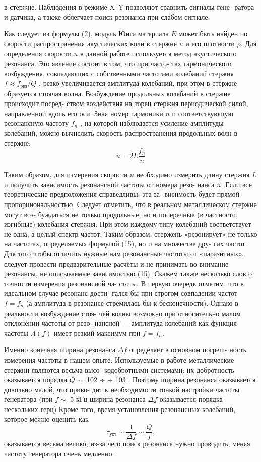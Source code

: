 \documentclass[a4, 12pt]{article}
\begin{document}
в стержне. Наблюдения в режиме X–Y позволяют сравнить сигналы гене-
ратора и датчика, а также облегчает поиск резонанса при слабом сигнале.
\par Как следует из формулы (2), модуль Юнга материала $E$ может быть
найден по скорости распространения акустических волн в стержне $u$ и его
плотности $\rho$. Для определения скорости $u$ в данной работе используется
метод акустического резонанса. Это явление состоит в том, что при часто-
тах гармонического возбуждения, совпадающих с собственными частотами
колебаний стержня $f \approx f_\text{рез}/Q$ , резко увеличивается амплитуда колебаний, при
этом в стержне образуется стоячая волна.
Возбуждение продольных колебаний в стержне происходит посред-
ством воздействия на торец стержня периодической силой, направленной
вдоль его оси. Зная номер гармоники $n$ и соответствующую резонансную
частоту $f_n$ , на которой наблюдается усиление амплитуды колебаний,
можно вычислить скорость распространения продольных волн в стержне:
\begin{equation}
    u = 2L\frac{f_n}{n}
\end{equation}

Таким образом, для измерения скорости $u$ необходимо измерить длину
стержня $L$ и получить зависимость резонансной частоты от номера резо-
нанса $n$. Если все теоретические предположения справедливы, эта за-
висимость будет прямой пропорциональностью.
Следует отметить, что в реальном металлическом стержне могут воз-
буждаться не только продольные, но и поперечные (в частности, изгибные)
колебания стержня. При этом каждому типу колебаний соответствует не
одна, а целый спектр частот. Таким образом, стержень «резонирует» не
только на частотах, определяемых формулой (15), но и на множестве дру-
гих частот. Для того чтобы отличить нужные нам резонансные частоты от
«паразитных», следует провести предварительные расчёты и не принимать
во внимание резонансы, не описываемые зависимостью (15).
Скажем также несколько слов о точности измерения резонансной ча-
стоты. В первую очередь отметим, что в идеальном случае резонанс дости-
гался бы при строгом совпадении частот $f = f_n$ (а амплитуда в резонансе
стремилась бы к бесконечности). Однако в реальности возбуждение стоя-
чей волны возможно при относительно малом отклонении частоты от резо-
нансной — амплитуда колебаний как функция частоты $A(f)$ имеет резкий
максимум при $f = f_n$.
\par Именно конечная ширина резонанса $\Delta f$ определяет в основном погреш-
ность измерения частоты в нашем опыте.
Используемые в работе металлические стержни являются весьма высо-
кодобротными системами: их добротность оказывается порядка $Q\sim$ 102 ÷
÷ 103 . Поэтому ширина резонанса оказывается довольно малой, что приво-
дит к необходимости тонкой настройки частоты генератора (при $f\sim$
 5 кГц ширина резонанса $\Delta f$ оказывается порядка нескольких герц)
Кроме того, время установления резонансных колебаний, которое можно
оценить как
\begin{equation}
    \tau_\text{уст} \sim \frac{1}{\Delta f} \sim \frac{Q}{f},
\end{equation}
оказывается весьма велико, из-за чего поиск резонанса нужно проводить, меняя частоту
генератора очень медленно.
\end{document}
